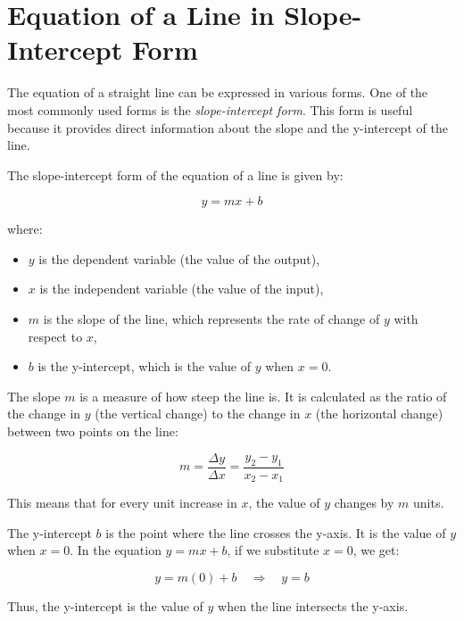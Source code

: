 \section{Equation of a Line in Slope-Intercept Form}

The equation of a straight line can be expressed in various forms. One of the most commonly used forms is the \textit{slope-intercept form}. This form is useful because it provides direct information about the slope and the y-intercept of the line.

\begin{definition}
The slope-intercept form of the equation of a line is given by:

\[
y = mx + b
\]

where:
\begin{itemize}
    \item \( y \) is the dependent variable (the value of the output),
    \item \( x \) is the independent variable (the value of the input),
    \item \( m \) is the slope of the line, which represents the rate of change of \( y \) with respect to \( x \),
    \item \( b \) is the y-intercept, which is the value of \( y \) when \( x = 0 \).
\end{itemize}
\end{definition}

\begin{definition}[Slope \( m \)]

The slope \( m \) is a measure of how steep the line is. It is calculated as the ratio of the change in \( y \) (the vertical change) to the change in \( x \) (the horizontal change) between two points on the line:

\[
m = \frac{\Delta y}{\Delta x} = \frac{y_2 - y_1}{x_2 - x_1}
\]
\end{definition}

This means that for every unit increase in \( x \), the value of \( y \) changes by \( m \) units.

\begin{definition} [Y-Intercept (\( b \))]
The y-intercept \( b \) is the point where the line crosses the y-axis. It is the value of \( y \) when \( x = 0 \). In the equation \( y = mx + b \), if we substitute \( x = 0 \), we get:

\[
y = m(0) + b \quad \Rightarrow \quad y = b
\]

Thus, the y-intercept is the value of \( y \) when the line intersects the y-axis.
\end{definition}

